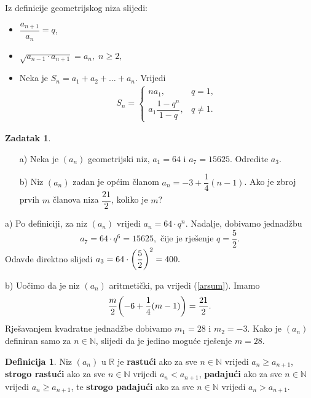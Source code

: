 \documentclass{book}
\let\originalleft\left
\let\originalright\right
\renewcommand{\left}{\mathopen{}\mathclose\bgroup\originalleft}
\renewcommand{\right}{\aftergroup\egroup\originalright}
\renewenvironment{proof}{%
    \vspace{-\parskip}\begin{oldproof}%
    }{%
    \end{oldproof}%
}
\theoremstyle{definition}
\theoremstyle{definition}
\newtheorem{definition}{Definicija}
\newtheorem{exercise}{Zadatak}
\theoremstyle{remark}
\begin{document}
\noindent Iz definicije geometrijskog niza slijedi:
\begin{itemize}
\item $\dfrac{a_{n+1}}{a_n}=q$,
\item $\sqrt{a_{n-1}\cdot a_{n+1}}=a_n, \; n\geq 2,$
\item Neka je $S_n=a_1+a_2+\dots+a_n$. Vrijedi
\begin{gather}
\label{geosum}
S_n=\begin{cases}
na_1, & q=1, \\
a_1\dfrac{1-q^n}{1-q}, & q\neq 1.
   \end{cases}
\end{gather}
\end{itemize}
\begin{exercise}\textbf{}
\begin{itemize}
\item[a)] Neka je $(a_n)$ geometrijski niz, $a_1=64$ i $a_7=15625$. Odredite $a_3$.
\item[b)] Niz $(a_n)$ zadan je općim članom $a_n=-3+\dfrac{1}{4}(n-1)$. Ako je zbroj prvih $m$ članova niza $\dfrac{21}{2}$, koliko je $m$?
\end{itemize}
\end{exercise}
\begin{proof}[Rješenje]
a) Po definiciji, za niz $(a_n)$ vrijedi $a_n=64\cdot q^n$. Nadalje, dobivamo jednadžbu
$$a_7=64\cdot q^6=15625,\text{ čije je rješenje } q=\dfrac{5}{2}.$$
Odavde direktno slijedi $a_3=64\cdot \left(\dfrac{5}{2}\right)^2=400.$

b) Uočimo da je niz $(a_n)$ aritmetički, pa vrijedi (\ref{arsum}). Imamo
$$\dfrac{m}{2}\left(-6+\dfrac{1}{4}(m-1)\right)=\dfrac{21}{2}.$$
Rješavanjem kvadratne jednadžbe dobivamo $m_1=28$ i $m_2=-3$. Kako je $(a_n)$ definiran samo za $n\in \mathbb{N}$, slijedi da je jedino moguće rješenje $m=28$.
\end{proof}
\begin{definition}
Niz $(a_n)$ u $\mathbb{R}$ je \textbf{rastući} ako za sve $n\in \mathbb{N}$ vrijedi $a_n\geq a_{n+1}$, \textbf{strogo rastući} ako za sve $n\in \mathbb{N}$ vrijedi $a_n<a_{n+1}$, \textbf{padajući} ako za sve $n\in \mathbb{N}$ vrijedi $a_n\geq a_{n+1}$, te \textbf{strogo padajući} ako za sve $n\in \mathbb{N}$ vrijedi $a_n>a_{n+1}$.
\end{definition}
\end{document}
